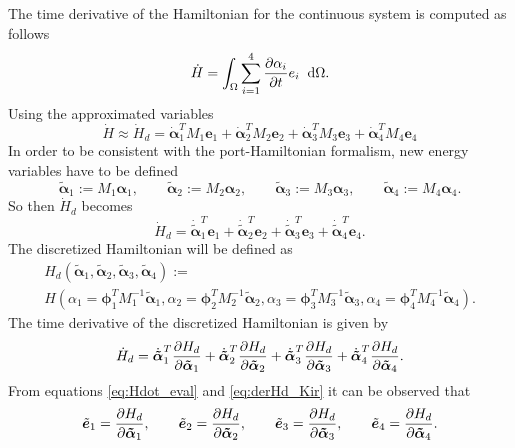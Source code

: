 \documentclass[preprint,12pt]{elsarticle}
\begin{document}
	The time derivative of the Hamiltonian for the continuous system is computed as follows
	\begin{equation}
	\dot{H} = \int_{\Omega}  \sum_{i=1}^{4} \diffp{\alpha_i}{t} e_i \; \d\Omega. 
	\end{equation}
	Using the approximated variables
	\begin{equation}
	\dot{H} \approx \dot{H}_d = \dot{\bm{\alpha}}_1^T M_1 \bm{e}_1 + \dot{\bm{\alpha}}_2^T M_2 \bm{e}_2 + \dot{\bm{\alpha}}_3^T M_3 \bm{e}_3 + \dot{\bm{\alpha}}_4^T M_4 \bm{e}_4
	\end{equation}
	In order to be consistent with the port-Hamiltonian formalism, new energy variables have to be defined
	\begin{equation}
	\bm{\tilde{\alpha}}_1 := M_1 \bm{\alpha}_1, \qquad \bm{\tilde{\alpha}}_2 := M_2 \bm{\alpha}_2, \qquad \bm{\tilde{\alpha}}_3 := M_3 \bm{\alpha}_3, \qquad \bm{\tilde{\alpha}}_4 := M_4 \bm{\alpha}_4.
	\end{equation}
	So then $\dot{H}_d$  becomes
	\begin{equation}
	\label{eq:Hdot_eval}
	\dot{H}_d = \dot{\bm{\tilde{\alpha}}}_1^T \bm{e}_1 + \dot{\bm{\tilde{\alpha}}}_2^T \bm{e}_2 + \dot{\bm{\tilde{\alpha}}}_3^T \bm{e}_3 + \dot{\bm{\tilde{\alpha}}}_4^T \bm{e}_4.
	\end{equation}
	The discretized Hamiltonian will be defined as
	\begin{multline}
	\label{eq:Hd_def_kir}
	H_d(\bm{\tilde{\alpha}}_1, \bm{\tilde{\alpha}}_2, \bm{\tilde{\alpha}}_3, \bm{\tilde{\alpha}}_4) := \\
	H(\alpha_1= \bm\phi_1^T M_1^{-1} \bm{\tilde{\alpha}}_1, \alpha_2= \bm\phi_2^T M_2^{-1} \bm{\tilde{\alpha}}_2, \alpha_3= \bm\phi_3^T M_3^{-1} \bm{\tilde{\alpha}}_3, \alpha_4= \bm\phi_4^T M_4^{-1} \bm{\tilde{\alpha}}_4).
	\end{multline}
	The time derivative of the discretized Hamiltonian is given by
	\begin{equation}
	\label{eq:derHd_Kir}
	\dot{H}_d = \dot{\bm{\tilde{\alpha}}}_1^T \diffp{H_d}{\bm{\tilde{\alpha}}_1} + \dot{\bm{\tilde{\alpha}}}_2^T \diffp{H_d}{\bm{\tilde{\alpha}}_2} + \dot{\bm{\tilde{\alpha}}}_3^T \diffp{H_d}{\bm{\tilde{\alpha}}_3} + \dot{\bm{\tilde{\alpha}}}_4^T \diffp{H_d}{\bm{\tilde{\alpha}}_4}.
	\end{equation} 
	From equations \eqref{eq:Hdot_eval} and \eqref{eq:derHd_Kir} it can be observed that
	\begin{equation}
	\tilde{\bm{e}}_1 = \diffp{H_d}{\bm{\tilde{\alpha}}_1}, \qquad  \tilde{\bm{e}}_2 = \diffp{H_d}{\bm{\tilde{\alpha}}_2}, \qquad  \tilde{\bm{e}}_3 = \diffp{H_d}{\bm{\tilde{\alpha}}_3}, \qquad  \tilde{\bm{e}}_4 = \diffp{H_d}{\bm{\tilde{\alpha}}_4}. 
	\end{equation}
\end{document}

